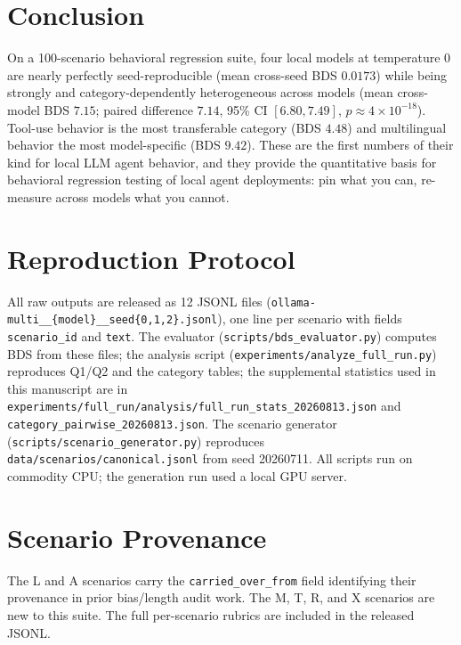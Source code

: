 \documentclass[11pt]{article}
\begin{document}
\section{Conclusion}
\label{sec:conclusion}

On a 100-scenario behavioral regression suite, four local models at
temperature 0 are nearly perfectly seed-reproducible (mean cross-seed BDS
$0.0173$) while being strongly and category-dependently heterogeneous
across models (mean cross-model BDS $7.15$; paired difference $7.14$, 95\%
CI $[6.80, 7.49]$, $p \approx 4\times10^{-18}$). Tool-use behavior is the
most transferable category (BDS $4.48$) and multilingual behavior the most
model-specific (BDS $9.42$). These are the first numbers of their kind for
local LLM agent behavior, and they provide the quantitative basis for
behavioral regression testing of local agent deployments: pin what you
can, re-measure across models what you cannot.




\appendix
\section{Reproduction Protocol}
\label{app:repro}

All raw outputs are released as 12 JSONL files
(\texttt{ollama-multi\_\_\{model\}\_\_seed\{0,1,2\}.jsonl}), one line per
scenario with fields \texttt{scenario\_id} and \texttt{text}. The
evaluator (\texttt{scripts/bds\_evaluator.py}) computes BDS from these
files; the analysis script
(\texttt{experiments/analyze\_full\_run.py}) reproduces Q1/Q2 and the
category tables; the supplemental statistics used in this manuscript are
in
\texttt{experiments/full\_run/analysis/full\_run\_stats\_20260813.json} and
\texttt{category\_pairwise\_20260813.json}. The scenario generator
(\texttt{scripts/scenario\_generator.py}) reproduces
\texttt{data/scenarios/canonical.jsonl} from seed 20260711. All scripts run
on commodity CPU; the generation run used a local GPU server.

\section{Scenario Provenance}
\label{app:prov}

The \textsc{L} and \textsc{A} scenarios carry the
\texttt{carried\_over\_from} field identifying their provenance in prior
bias/length audit work. The \textsc{M}, \textsc{T}, \textsc{R}, and
\textsc{X} scenarios are new to this suite. The full per-scenario rubrics
are included in the released JSONL.
\end{document}
